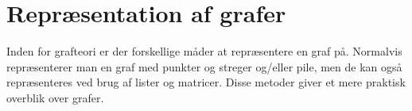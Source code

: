\section{Repræsentation af grafer}
Inden for grafteori er der forskellige måder at repræsentere en graf på. Normalvis repræsenterer man en graf med punkter og streger og/eller pile, men de kan også repræsenteres ved brug af lister og matricer. Disse metoder giver et mere praktisk overblik over grafer.
